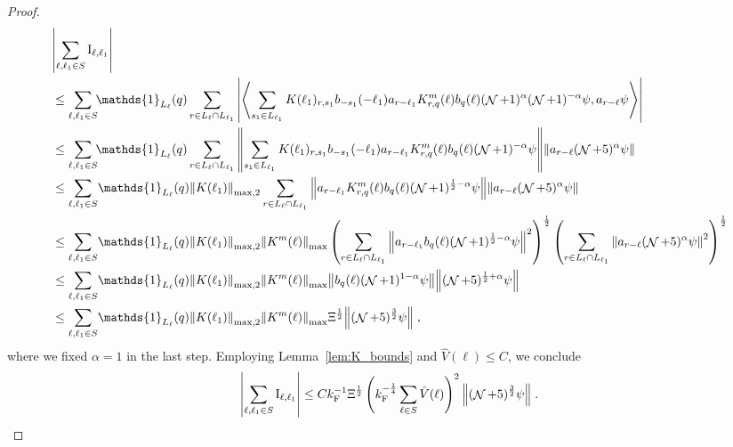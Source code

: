\documentclass[sn-mathphys, Numbered ,a4paper]{sn-jnl}%
\DeclareMathOperator{\NN}{\mathcal{N}}
\newcommand{\eva}[1]{\left\langle #1 \right\rangle}
\newcommand{\F}{\mathrm{F}}
\newcommand{\I}{\mathrm{I}}
\theoremstyle{plain}
\theoremstyle{definition}
\theoremstyle{remark}
\theoremstyle{plain}
\theoremstyle{definition}
\theoremstyle{remark}
\begin{document}
\begin{proof}
\begin{align}
	&\abs{\sum_{\ell, \ell_1 \in S} \I_{\ell,\ell_1}} \nonumber\\
    &\leq \sum\limits_{\ell,\ell_1 \in S}\!\! \mathds{1}_{L_\ell}(q)
    		\sum\limits_{r \in L_\ell \cap L_{\ell_1}}
    		\abs{\eva{ \sum\limits_{s_1 \in L_{\ell_1}} K(\ell_1)_{r,s_1} b_{-s_1}(-\ell_1) a_{r-\ell_1} K^m_{r,q}(\ell) b_{q}(\ell) (\NN+1)^{\alpha} (\NN+1)^{-\alpha} \psi, 
    		 a_{r-\ell} \psi }}\nonumber\\
    &\leq \sum\limits_{\ell,\ell_1 \in S} \!\!\mathds{1}_{L_\ell}(q)
    		\sum\limits_{r \in L_\ell \cap L_{\ell_1}}
    		\norm{\sum\limits_{s_1 \in L_{\ell_1}} K(\ell_1)_{r,s_1} b_{-s_1}(-\ell_1) a_{r-\ell_1} K^m_{r,q}(\ell) b_{q}(\ell) (\NN+1)^{-\alpha}\psi}
    		\norm{  a_{r-\ell} (\NN+5)^{\alpha}\psi } \nonumber\\
    &\leq \sum\limits_{\ell,\ell_1 \in S} \!\mathds{1}_{L_\ell}(q)
    		\norm{K(\ell_1)}_{\mathrm{max,2}}
    		\sum\limits_{r \in L_\ell\cap L_{\ell_1}} 
    		\norm{a_{r-\ell_1} K^m_{r,q}(\ell)b_{q}(\ell) (\NN+1)^{\frac 12 -\alpha} \psi}
    		\norm { a_{r-\ell} (\NN+5)^{\alpha} \psi }\nonumber\\
	&\leq \sum\limits_{\ell,\ell_1 \in S} \!\mathds{1}_{L_\ell}(q)
    		\norm{K(\ell_1)}_{\mathrm{max,2}}
    		\norm{K^m(\ell)}_{\max}
    		\left( \sum\limits_{r \in L_\ell\cap L_{\ell_1}} 
    		\norm{a_{r-\ell_1} b_{q}(\ell) (\NN+1)^{\frac 12 -\alpha} \psi}^2 \right)^{\frac 12}
    		\left( \sum\limits_{r \in L_\ell\cap L_{\ell_1}} \norm { a_{r-\ell} (\NN+5)^{\alpha} \psi}^2 \right)^{\frac 12} \nonumber\\
    &\leq \sum\limits_{\ell,\ell_1 \in S} \!\mathds{1}_{L_\ell}(q)
    		\norm{K(\ell_1)}_{\mathrm{max,2}}
    		\norm{K^m(\ell)}_{\max}
    		\norm{ b_{q}(\ell) (\NN+1)^{1-\alpha} \psi}
    		\norm {(\NN+5)^{\frac 12 + \alpha} \psi }\nonumber\\
    &\leq \sum\limits_{\ell,\ell_1 \in S} \!\mathds{1}_{L_\ell}(q)
    		\norm{K(\ell_1)}_{\mathrm{max,2}}
    		\norm{K^m(\ell)}_{\max}
    		\Xi^{\frac 12}
    		\norm {(\NN+5)^{\frac 32} \psi} \;,
\end{align}
where we fixed $ \alpha = 1 $ in the last step. Employing Lemma~\ref{lem:K_bounds} and $ \hat{V}(\ell) \le C $, we conclude
\begin{equation}
	\abs{\sum_{\ell, \ell_1 \in S} \I_{\ell,\ell_1}}
	\le C k_{\F}^{-1} \Xi^{\frac 12}
		\left( k_{\F}^{-\frac 14} \sum_{\ell \in S} \hat{V}(\ell) \right)^2
		\norm{(\NN+5)^{\frac 32} \psi} \;.
\end{equation}

\end{proof}
\end{document}
